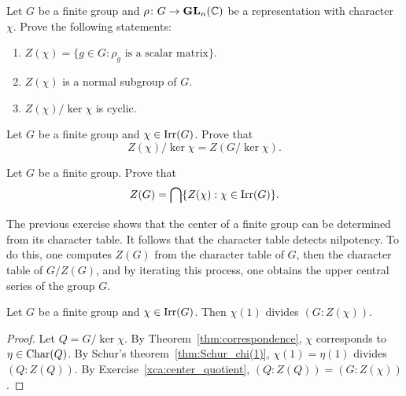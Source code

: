 \begin{exercise}
\label{xca:center}
    Let $G$ be a finite group and $\rho\colon G\to\mathbf{GL}_n(\mathbb{C})$ be a representation with character 
    $\chi$. Prove the following statements: 
    \begin{enumerate}
        \item $Z(\chi)=\{g\in G:\rho_g\text{ is a scalar matrix}\}$. 
        \item $Z(\chi)$ is a normal subgroup of $G$. 
        \item $Z(\chi)/\ker\chi$ is cyclic.
    \end{enumerate}
\end{exercise}


\begin{exercise}
\label{xca:center_quotient}
    Let $G$ be a finite group and $\chi\in\operatorname{Irr}(G)$. 
    Prove that 
    \[
    Z(\chi)/\ker\chi=Z(G/\ker\chi).
    \]
\end{exercise}

\begin{exercise}
\label{xca:center_ofG}
    Let $G$ be a finite group. Prove that
    \[
    Z(G)=\bigcap\{Z(\chi):\chi\in\operatorname{Irr}(G)\}.
    \]
\end{exercise}

The previous exercise shows that the center of a finite group can be determined
from its character table. It follows that the character table detects
nilpotency. To do this, one computes $Z(G)$ from the character table of $G$, then
the character table of $G/Z(G)$, and by iterating this process, one obtains the
upper central series of the group $G$. 

\begin{lemma}
\label{lem:Ito}
    Let $G$ be a finite group and 
    $\chi\in\operatorname{Irr}(G)$. Then $\chi(1)$ divides $(G:Z(\chi))$. 
\end{lemma}

\begin{proof}
    Let $Q=G/\ker\chi$. 
    By Theorem~\ref{thm:correspondence}, $\chi$ corresponds to 
    $\eta\in\operatorname{Char}(Q)$. 
    By Schur's theorem~\ref{thm:Schur_chi(1)}, 
    $\chi(1)=\eta(1)$ divides $(Q:Z(Q))$. By Exercise~\ref{xca:center_quotient}, 
    $(Q:Z(Q))=(G:Z(\chi))$.    
\end{proof}

